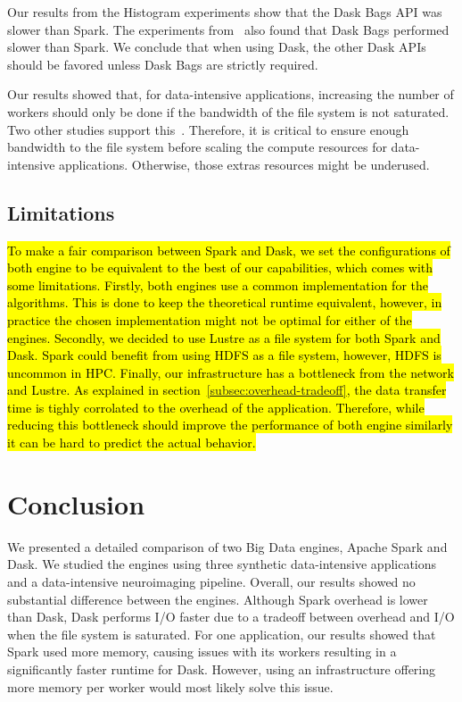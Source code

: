 \documentclass[AMA,STIX1COL]{WileyNJD-v2}
\newcommand{\HL}[1]{\hl{#1}}
\begin{document}
Our results from the Histogram experiments show that the Dask Bags API was slower than Spark.
The experiments from~\cite{10.1145/3225058.3225128} also found that Dask Bags performed slower than Spark.
We conclude that when using Dask, the other Dask APIs should be favored unless Dask Bags are strictly required.
										
Our results showed that, for data-intensive applications, increasing the number of workers should only be done if the bandwidth of the file system is not saturated.
Two other studies support this~\cite{8943502, 8588652}.
Therefore, it is critical to ensure enough bandwidth to the file system before scaling the compute resources for data-intensive applications.
Otherwise, those extras resources might be underused.
		
\subsection{Limitations}
\HL{
	To make a fair comparison between Spark and Dask, we set the configurations of both
	engine to be equivalent to the best of our capabilities, which comes with some limitations.
	Firstly, both engines use a common implementation for the algorithms.
	This is done to keep the theoretical runtime equivalent, however, in practice the
	chosen implementation might not be optimal for either of the engines.
	Secondly, we decided to use Lustre as a file system for both Spark and Dask.
	Spark could benefit from using HDFS as a file system, however, HDFS is uncommon in HPC.
	Finally, our infrastructure has a bottleneck from the network and Lustre.
	As explained in section~{\ref{subsec:overhead-tradeoff}}, the data transfer time is tighly corrolated to the overhead of the application.
	Therefore, while reducing this bottleneck should improve the performance of both engine similarly
	it can be hard to predict the actual behavior.
}
		
\section{Conclusion}
We presented a detailed comparison of two Big Data engines, Apache Spark and Dask.
We studied the engines using three synthetic data-intensive applications and a data-intensive neuroimaging pipeline.
Overall, our results showed no substantial difference between the engines.
Although Spark overhead is lower than Dask, Dask performs I/O faster due to a tradeoff between overhead and I/O when the file system is saturated.
For one application, our results showed that Spark used more memory, causing issues with its workers resulting in a significantly faster runtime for Dask.
However, using an infrastructure offering more memory per worker would most likely solve this issue.
											
\end{document}
